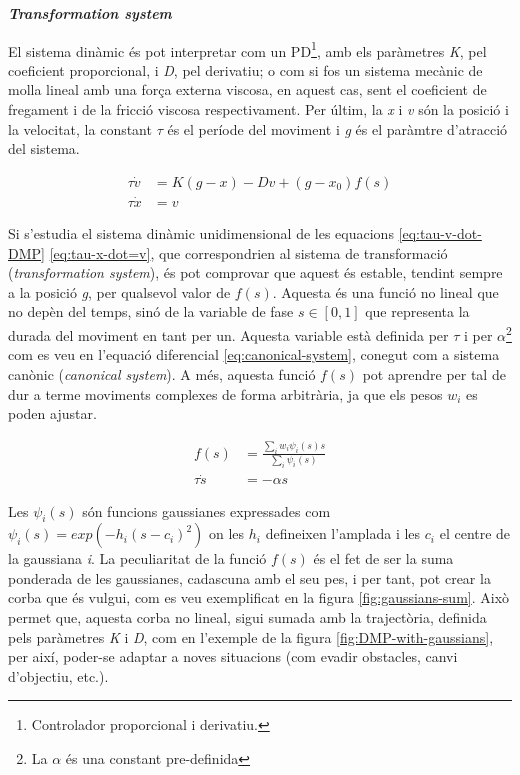 \documentclass[12pt,a4paper,final,twoside]{article}
\begin{document}
\vspace{20pt}
\textbf{\textit{Transformation system}}

El sistema dinàmic és pot interpretar com un PD\footnote{Controlador proporcional i derivatiu.}, amb els paràmetres \textit{K}, pel coeficient proporcional, i \textit{D}, pel derivatiu; o com si fos un sistema mecànic de molla lineal amb una força externa viscosa, en aquest cas, sent el coeficient de fregament i de la fricció viscosa respectivament. Per últim, la \textit{x} i \textit{v} són la posició i la velocitat, la constant $\tau$ és el període del moviment i \textit{g} és el paràmtre d'atracció del sistema.

\begin{align}
\tau \dot{v} &= K(g - x) - Dv + (g - x_0)f(s)\label{eq:tau-v-dot-DMP}\\
\tau \dot{x} &= v\label{eq:tau-x-dot=v}
\end{align}

Si s'estudia el sistema dinàmic unidimensional de les equacions \eqref{eq:tau-v-dot-DMP} \eqref{eq:tau-x-dot=v}, que correspondrien al sistema de transformació (\textit{transformation system}), és pot comprovar que aquest és estable, tendint sempre a la posició \textit{g}, per qualsevol valor de $f(s)$. Aquesta és una funció no lineal que no depèn del temps, sinó de la variable de fase $s\in [0,1]$ que representa la durada del moviment en tant per un. Aquesta variable està definida per $\tau$ i per $\alpha$\footnote{La $\alpha$ és una constant pre-definida} com es veu en l'equació diferencial \eqref{eq:canonical-system}, conegut com a sistema canònic (\textit{canonical system}). A més, aquesta funció $f(s)$ pot aprendre per tal de dur a terme moviments complexes de forma arbitrària, ja que els pesos $w_i$ es poden ajustar.

\begin{align}
f(s) &= \frac{\sum_i w_i \psi_i(s)s}{\sum_i \psi_i(s)} \\
\tau \dot{s} &= - \alpha s \label{eq:canonical-system}
\end{align}

Les $\psi_i(s)$ són funcions gaussianes expressades com $\psi_i(s)=exp(-h_i(s-c_i)^2)$ on les $h_i$ defineixen l'amplada i les $c_i$ el centre de la gaussiana \textit{i}. La peculiaritat de la funció $f(s)$ és el fet de ser la suma ponderada de les gaussianes, cadascuna amb el seu pes, i per tant, pot crear la corba que és vulgui, com es veu exemplificat en la figura \ref{fig:gaussians-sum}. Això permet que, aquesta corba no lineal, sigui sumada amb la trajectòria, definida pels paràmetres \textit{K} i \textit{D}, com en l'exemple de la figura \ref{fig:DMP-with-gaussians}, per així, poder-se adaptar a noves situacions (com evadir obstacles, canvi d'objectiu, etc.).
\end{document}
